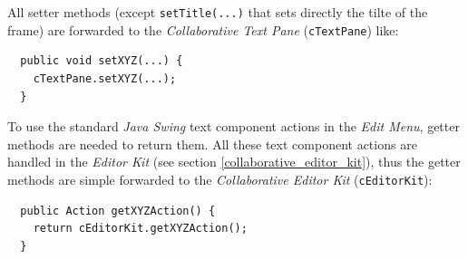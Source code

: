 All setter methods (except \texttt{setTitle(...)} that sets directly the tilte of the frame) are forwarded to the \textit{Collaborative Text Pane} (\texttt{cTextPane}) like:
\begin{verbatim}
  public void setXYZ(...) {
    cTextPane.setXYZ(...);
  }
\end{verbatim}

To use the standard \textit{Java Swing} text component actions in the \textit{Edit Menu}, getter methods are needed to return them. All these text component actions are handled in the \textit{Editor Kit} (see section \ref{collaborative_editor_kit}), thus the getter methods are simple forwarded to the \textit{Collaborative Editor Kit} (\texttt{cEditorKit}):
\begin{verbatim}
  public Action getXYZAction() {
    return cEditorKit.getXYZAction();
  }
\end{verbatim}


